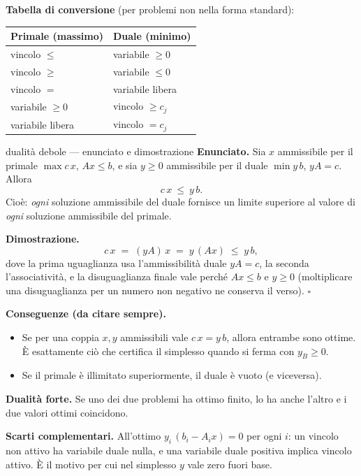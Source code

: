 \documentclass[11pt,a4paper]{article}
\begin{document}
\textbf{Tabella di conversione} (per problemi non nella forma standard):
\begin{center}
\begin{tabular}{@{}ll@{}}
\toprule
\textbf{Primale (massimo)} & \textbf{Duale (minimo)}\\
\midrule
vincolo $\le$              & variabile $\ge 0$\\
vincolo $\ge$              & variabile $\le 0$\\
vincolo $=$                & variabile libera\\
\addlinespace
variabile $\ge 0$          & vincolo $\ge c_j$\\
variabile libera           & vincolo $= c_j$\\
\bottomrule
\end{tabular}
\end{center}

\begin{teo}{dualità debole --- enunciato e dimostrazione}
\textbf{Enunciato.} Sia $x$ ammissibile per il primale $\max c\,x$, $Ax \le b$,
e sia $y \ge 0$ ammissibile per il duale $\min y\,b$, $yA = c$. Allora
\[ c\,x \ \le\ y\,b .\]
Cioè: \emph{ogni} soluzione ammissibile del duale fornisce un limite superiore al valore
di \emph{ogni} soluzione ammissibile del primale.

\textbf{Dimostrazione.}
\[ c\,x \;=\; (y A)\,x \;=\; y\,(A x) \;\le\; y\,b, \]
dove la prima uguaglianza usa l'ammissibilità duale $yA = c$, la seconda l'associatività,
e la disuguaglianza finale vale perché $Ax \le b$ e $y \ge 0$
(moltiplicare una disuguaglianza per un numero non negativo ne conserva il verso). $\square$

\textbf{Conseguenze (da citare sempre).}
\begin{itemize}
\item Se per una coppia $x, y$ ammissibili vale $c\,x = y\,b$, allora entrambe sono ottime.
      È esattamente ciò che certifica il simplesso quando si ferma con $y_B \ge 0$.
\item Se il primale è illimitato superiormente, il duale è vuoto (e viceversa).
\end{itemize}
\end{teo}

\textbf{Dualità forte.} Se uno dei due problemi ha ottimo finito, lo ha anche l'altro
e i due valori ottimi coincidono.

\textbf{Scarti complementari.} All'ottimo $y_i \,(b_i - A_i x) = 0$ per ogni $i$:
un vincolo non attivo ha variabile duale nulla, e una variabile duale positiva implica
vincolo attivo. È il motivo per cui nel simplesso $y$ vale zero fuori base.
\end{document}
